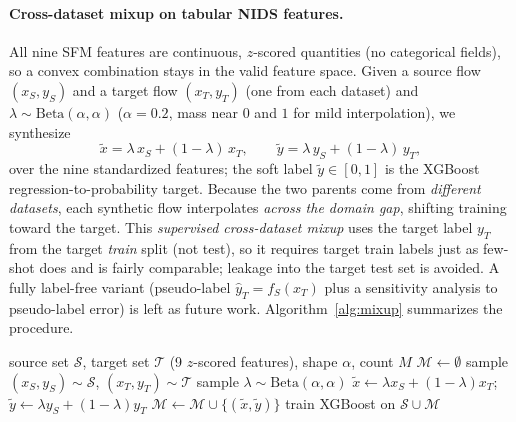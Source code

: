 \documentclass[preprint,12pt,authoryear]{elsarticle}
\begin{document}
\paragraph{Cross-dataset mixup on tabular NIDS features.} All nine SFM features are
continuous, $z$-scored quantities (no categorical fields), so a convex combination
stays in the valid feature space. Given a source flow $(x_S, y_S)$ and a target flow
$(x_T, y_T)$ (one from each dataset) and $\lambda \sim \mathrm{Beta}(\alpha,\alpha)$
($\alpha=0.2$, mass near $0$ and $1$ for mild interpolation), we synthesize
\begin{equation}
\tilde{x} = \lambda\, x_S + (1-\lambda)\, x_T,
\qquad
\tilde{y} = \lambda\, y_S + (1-\lambda)\, y_T,
\label{eq:mixup}
\end{equation}
over the nine standardized features; the soft label $\tilde{y}\in[0,1]$ is the
XGBoost regression-to-probability target. Because the two parents come from
\emph{different datasets}, each synthetic flow interpolates \emph{across the domain
gap}, shifting training toward the target. This \emph{supervised cross-dataset
mixup} uses the target label $y_T$ from the target \emph{train} split (not test), so
it requires target train labels just as few-shot does and is fairly comparable;
leakage into the target test set is avoided. A fully label-free variant (pseudo-label
$\hat{y}_T = f_S(x_T)$ plus a sensitivity analysis to pseudo-label error) is left as
future work. Algorithm~\ref{alg:mixup} summarizes the procedure.

\begin{algorithm}[h]
\caption{Cross-dataset mixup for tabular NIDS features}
\label{alg:mixup}
\begin{algorithmic}[1]
\Require source set $\mathcal{S}$, target set $\mathcal{T}$ (9 $z$-scored
features), shape $\alpha$, count $M$
\State $\mathcal{M} \gets \emptyset$
  \State sample $(x_S,y_S)\sim\mathcal{S}$, $(x_T,y_T)\sim\mathcal{T}$
  \State sample $\lambda \sim \mathrm{Beta}(\alpha,\alpha)$
  \State $\tilde{x} \gets \lambda x_S + (1-\lambda) x_T$;\;
         $\tilde{y} \gets \lambda y_S + (1-\lambda) y_T$
  \State $\mathcal{M} \gets \mathcal{M} \cup \{(\tilde{x},\tilde{y})\}$
\EndFor
\State \Return train XGBoost on $\mathcal{S}\cup\mathcal{M}$
\end{algorithmic}
\end{algorithm}
\end{document}
